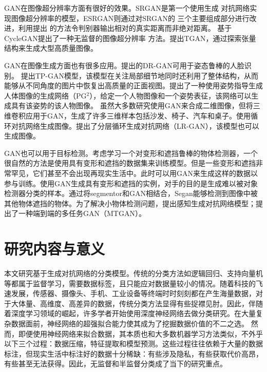 GAN在图像超分辨率方面有很好的效果。SRGAN\cite{ledig2017photo}是第一个使用生成
对抗网络实现图像超分辨率的模型，ESRGAN\cite{wang2018esrgan}则通过对SRGAN的
三个主要组成部分进行改进，利用\citet{jolicoeur2018relativistic}提出
的方法令判别器输出相对的真实距离而非绝对距离。
\citet{yuan2018unsupervised}基于CycleGAN\cite{zhu2017unpaired}提出了一种无监督的图像超分辨率
方法。\citet{ding2019tgan}提出TGAN，通过探索张量结构来生成大型高质量图像。

GAN在图像生成方面也有很多应用。\citet{tran2017disentangled}提出的DR-GAN可用于姿态鲁棒的人脸识别。
\citet{huang2017beyond}提出TP-GAN模型，该模型在关注局部细节地同时还利用了整体结构，从而能够从不同角度的图片中恢复出高质量的正面视图。\citet{ma2017pose}提出了一种使用姿势指导生成人体图像的生成网络（PG$^2$），给定一个人物图像和一个姿势表征，该网络可以生成具有该姿势的该人物图像。
虽然大多数研究使用GAN来合成二维图像\cite{bao2017cvae,dong2017semantic}，但\citet{wu2016learning}将三维卷积应用于GAN，生成了许多三维样本包括沙发、椅子、汽车和桌子。\citet{im2016generating}使用循环对抗网络生成图像。\citet{yang2017lr}提出了分层循环生成对抗网络（LR-GAN），该模型也可以生成图像。

GAN也可以用于目标检测。考虑学习一个对变形和遮挡鲁棒的物体检测器，一个很自然的方法是使用具有变形和遮挡的数据集来训练模型。但是一些变形和遮挡非常罕见，它们甚至不会出现再现实生活中。此时可以用GAN来生成这样的数据以参与训练。\citet{wang2017fast}使用GAN生成具有变形和遮挡的实例，对手的目的是生成难以被对象检测器分类的样本。通过将segmentor和GAN相结合，Segan\cite{ehsani2018segan}能够检测到图像中被其他物体遮挡的物体。为了解决小物体检测问题，\citet{li2017perceptual}提出感知生成对抗网络模型；\citet{bai2018sod}提出了一种端到端的多任务GAN（MTGAN）。

\section{研究内容与意义}
本文研究基于生成对抗网络的分类模型。传统的分类方法如逻辑回归、支持向量机等都属于监督学习，需要数据标签，且只能应对数据量较小的情况。随着科技的飞速发展，传感器、摄像头、手机、工业设备等终端时时刻刻都在产生海量数据，对于大体量、高维度、高差异的数据，传统分类方法显得有些捉襟见肘。因此，伴随着深度学习领域的崛起，许多学者开始使用深度神经网络去做分类研究\cite{krizhevsky2012imagenet,taigman2014deepface}。在大量复杂数据面前，神经网络的超强拟合能力使其成为了挖掘数据价值的不二之选。
然而，即便使用神经网络来拟合数据，其本质也和大多数机器学习方法类似，不外乎
以下三个过程：数据压缩，特征提取和模型预测。这些过程往往依赖于大量的数据标注，但现实生活中标注好的数据十分稀缺：有些涉及隐私，有些获取代价高昂，有些甚至无法获得。因此，无监督和半监督分类成了当下的研究重点。

